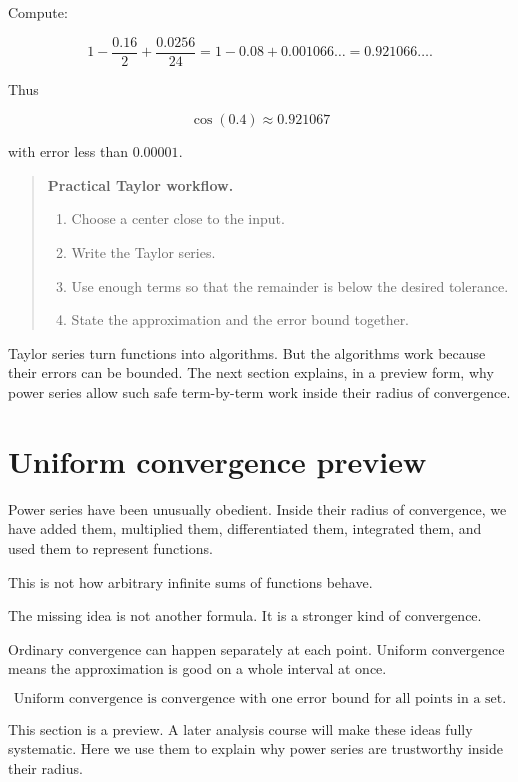 Compute:

\[
1-\frac{0.16}{2}+\frac{0.0256}{24}
=
1-0.08+0.001066\ldots
=
0.921066\ldots.
\]

Thus

\[
\boxed{
\cos(0.4)\approx0.921067
}
\]

with error less than \(0.00001\).

\begin{quote}
\textbf{Practical Taylor workflow.}

\begin{enumerate}
\item Choose a center close to the input.

\item Write the Taylor series.

\item Use enough terms so that the remainder is below the desired tolerance.

\item State the approximation and the error bound together.
\end{enumerate}
\end{quote}

Taylor series turn functions into algorithms.  But the algorithms work because their
errors can be bounded.  The next section explains, in a preview form, why power series
allow such safe term-by-term work inside their radius of convergence.

\section{Uniform convergence preview}
\label{sec:uniform-convergence-preview}

Power series have been unusually obedient.  Inside their radius of convergence, we have
added them, multiplied them, differentiated them, integrated them, and used them to
represent functions.

This is not how arbitrary infinite sums of functions behave.

The missing idea is not another formula.  It is a stronger kind of convergence.

Ordinary convergence can happen separately at each point.  Uniform convergence means
the approximation is good on a whole interval at once.

\[
\boxed{
\text{Uniform convergence is convergence with one error bound for all points in a set.}
}
\]

This section is a preview.  A later analysis course will make these ideas fully systematic.
Here we use them to explain why power series are trustworthy inside their radius.

